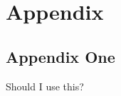 \documentclass[phd,appendix,figures]{uithesis}
\begin{document}
\chapter{Appendix}

\section{Appendix One}
Should I use this?


 
\end{document}
